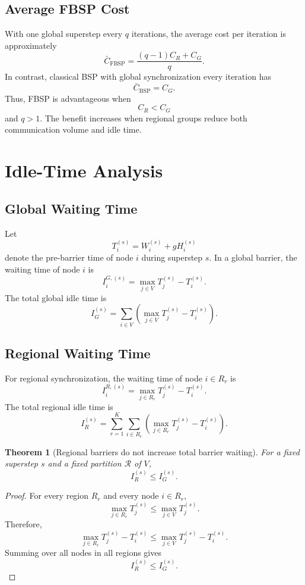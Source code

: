 ﻿\documentclass[10pt,journal]{IEEEtran}
\newtheorem{theorem}{Theorem}
\begin{document}
	\subsection{Average FBSP Cost}
	
	With one global superstep every $q$ iterations, the average cost per iteration is approximately
	\[
	\bar{C}_{\mathrm{FBSP}}
	=
	\frac{(q-1)C_R+C_G}{q}.
	\]
	In contrast, classical BSP with global synchronization every iteration has
	\[
	\bar{C}_{\mathrm{BSP}}=C_G.
	\]
	Thus, FBSP is advantageous when
	\[
	C_R < C_G
	\]
	and $q>1$. The benefit increases when regional groups reduce both communication volume and idle time.
	
	\section{Idle-Time Analysis}
	
	\subsection{Global Waiting Time}
	
	Let
	\[
	T_i^{(s)} = W_i^{(s)} + gH_i^{(s)}
	\]
	denote the pre-barrier time of node $i$ during superstep $s$. In a global barrier, the waiting time of node $i$ is
	\[
	I_i^{G,(s)}
	=
	\max_{j\in V}T_j^{(s)}-T_i^{(s)}.
	\]
	The total global idle time is
	\[
	I_G^{(s)}
	=
	\sum_{i\in V}
	\left(
	\max_{j\in V}T_j^{(s)}-T_i^{(s)}
	\right).
	\]
	
	\subsection{Regional Waiting Time}
	
	For regional synchronization, the waiting time of node $i\in R_r$ is
	\[
	I_i^{R,(s)}
	=
	\max_{j\in R_r}T_j^{(s)}-T_i^{(s)}.
	\]
	The total regional idle time is
	\[
	I_R^{(s)}
	=
	\sum_{r=1}^{K}
	\sum_{i\in R_r}
	\left(
	\max_{j\in R_r}T_j^{(s)}-T_i^{(s)}
	\right).
	\]
	
	\begin{theorem}[Regional barriers do not increase total barrier waiting]
		For a fixed superstep $s$ and a fixed partition $\mathcal{R}$ of $V$,
		\[
		I_R^{(s)} \leq I_G^{(s)}.
		\]
	\end{theorem}
	
	\begin{proof}
		For every region $R_r$ and every node $i\in R_r$,
		\[
		\max_{j\in R_r}T_j^{(s)}
		\leq
		\max_{j\in V}T_j^{(s)}.
		\]
		Therefore,
		\[
		\max_{j\in R_r}T_j^{(s)}-T_i^{(s)}
		\leq
		\max_{j\in V}T_j^{(s)}-T_i^{(s)}.
		\]
		Summing over all nodes in all regions gives
		\[
		I_R^{(s)} \leq I_G^{(s)}.
		\]
	\end{proof}
	
\end{document}
